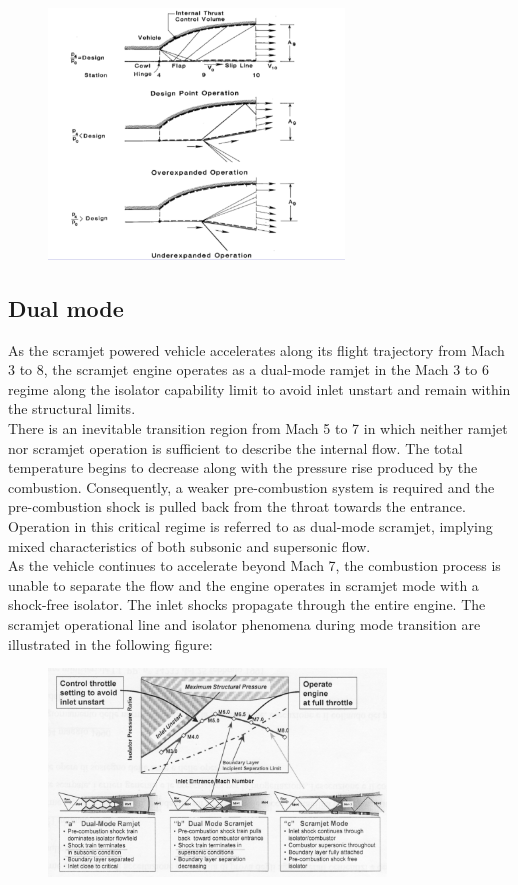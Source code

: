 \documentclass[12pt]{article}
\begin{document}
\begin{figure}[!ht]
\centering
\includegraphics[width=0.7\textwidth]{figures/scramnozzle.png}
\end{figure}

\subsection{Dual mode}

As the scramjet powered vehicle accelerates along its flight trajectory from Mach 3 to 8, the scramjet engine operates as a dual-mode ramjet in the Mach 3 to 6 regime along the isolator capability limit to avoid inlet unstart and remain within the structural limits.\\
There is an inevitable transition region from Mach 5 to 7 in which neither ramjet nor scramjet operation is sufficient to describe the internal flow. The total temperature begins to decrease along with the pressure rise produced by the combustion. Consequently, a weaker pre-combustion system is required and the pre-combustion shock is pulled back from the throat towards the entrance. Operation in this critical regime is referred to as dual-mode scramjet, implying mixed characteristics of both subsonic and supersonic flow.\\
As the vehicle continues to accelerate beyond Mach 7, the combustion process is unable to separate the flow and the engine operates in scramjet mode with a shock-free isolator. The inlet shocks propagate through the entire engine. The scramjet operational line and isolator phenomena during mode transition are illustrated in the following figure:

\begin{figure}[!ht]
\centering
\includegraphics[width=0.8\textwidth]{figures/dualmode.png}
\end{figure}
\end{document}
